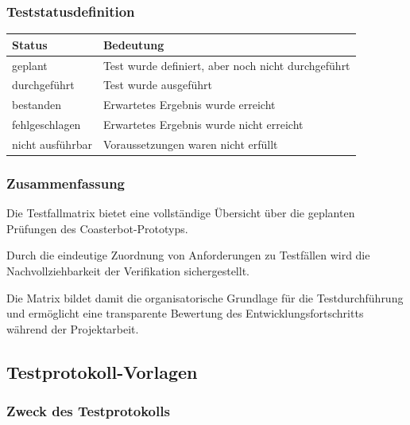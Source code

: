 \documentclass[
  a4paper,
  12pt,
  DIV=12,        %
  parskip=half,  %
  headings=small %
]{scrartcl}
\theoremstyle{definition}
\theoremstyle{definition}
\begin{document}
\subsubsection{Teststatusdefinition}\label{teststatusdefinition}

\begin{longtable}[]{@{}
  >{\raggedright\arraybackslash}p{}
  >{\raggedright\arraybackslash}p{}@{}}
\toprule\noalign{}
\begin{minipage}[b]{\linewidth}\raggedright
Status
\end{minipage} & \begin{minipage}[b]{\linewidth}\raggedright
Bedeutung
\end{minipage} \\
\midrule\noalign{}
\endhead
\bottomrule\noalign{}
\endlastfoot
geplant & Test wurde definiert, aber noch nicht durchgeführt \\
durchgeführt & Test wurde ausgeführt \\
bestanden & Erwartetes Ergebnis wurde erreicht \\
fehlgeschlagen & Erwartetes Ergebnis wurde nicht erreicht \\
nicht ausführbar & Voraussetzungen waren nicht erfüllt \\
\end{longtable}

\subsubsection{Zusammenfassung}\label{zusammenfassung-3}

Die Testfallmatrix bietet eine vollständige Übersicht über die geplanten
Prüfungen des Coasterbot-Prototyps.

Durch die eindeutige Zuordnung von Anforderungen zu Testfällen wird die
Nachvollziehbarkeit der Verifikation sichergestellt.

Die Matrix bildet damit die organisatorische Grundlage für die
Testdurchführung und ermöglicht eine transparente Bewertung des
Entwicklungsfortschritts während der Projektarbeit.

\subsection{Testprotokoll-Vorlagen}\label{testprotokoll-vorlagen}

\subsubsection{Zweck des Testprotokolls}\label{zweck-des-testprotokolls}
\end{document}
